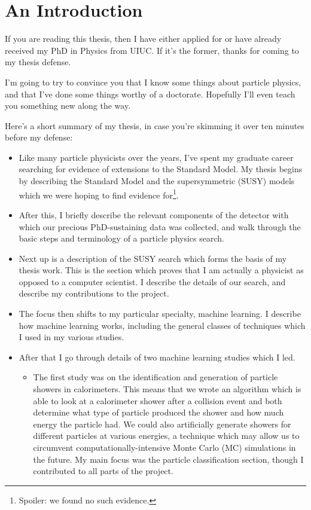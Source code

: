 \chapter*{An Introduction}

If you are reading this thesis, then I have either applied for or have  already received my PhD in Physics from UIUC. If it's the former, thanks for coming to my thesis defense.

I'm going to try to convince you that I know some things about particle physics, and that I've done some things worthy of a doctorate. Hopefully I'll even teach you something new along the way.

Here's a short summary of my thesis, in case you're skimming it over ten minutes before my defense:

\begin{itemize}

    \item Like many particle physicists over the years, I've spent my graduate career searching for evidence of extensions to the Standard Model. My thesis begins by describing the Standard Model and the supersymmetric (SUSY) models which we were hoping to find evidence for\footnote{Spoiler: we found no such evidence.}.
    
    \item After this, I briefly describe the relevant components of the detector with which our precious PhD-sustaining data was collected, and walk through the basic steps and terminology of a particle physics search.
    
    \item Next up is a description of the SUSY search which forms the basis of my thesis work. This is the section which proves that I am actually a physicist as opposed to a computer scientist. I describe the details of our search, and describe my contributions to the project.

    \item The focus then shifts to my particular specialty, machine learning. I describe how machine learning works, including the general classes of techniques which I used in my various studies.
    
    \item After that I go through details of two machine learning studies which I led.
    
    \begin{itemize}
    
        \item The first study was on the identification and generation of particle showers in calorimeters. This means that we wrote an algorithm which is able to look at a calorimeter shower after a collision event and both determine what type of particle produced the shower and how much energy the particle had. We could also artificially generate showers for different particles at various energies, a technique which may allow us to circumvent computationally-intensive Monte Carlo (MC) simulations in the future. My main focus was the particle classification section, though I contributed to all parts of the project.


\end{itemize}
\end{itemize}
